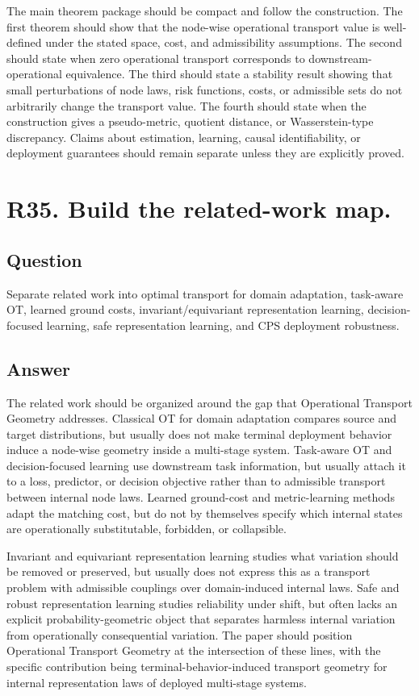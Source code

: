 \documentclass[11pt,a4paper]{article}
\begin{document}
The main theorem package should be compact and follow the construction. The first theorem should show that the node-wise operational transport value is well-defined under the stated space, cost, and admissibility assumptions. The second should state when zero operational transport corresponds to downstream-operational equivalence. The third should state a stability result showing that small perturbations of node laws, risk functions, costs, or admissible sets do not arbitrarily change the transport value. The fourth should state when the construction gives a pseudo-metric, quotient distance, or Wasserstein-type discrepancy. Claims about estimation, learning, causal identifiability, or deployment guarantees should remain separate unless they are explicitly proved.

\section*{R35. Build the related-work map.}

\subsection*{Question}

Separate related work into optimal transport for domain adaptation, task-aware OT, learned ground costs, invariant/equivariant representation learning, decision-focused learning, safe representation learning, and CPS deployment robustness.

\subsection*{Answer}

The related work should be organized around the gap that Operational Transport Geometry addresses. Classical OT for domain adaptation compares source and target distributions, but usually does not make terminal deployment behavior induce a node-wise geometry inside a multi-stage system. Task-aware OT and decision-focused learning use downstream task information, but usually attach it to a loss, predictor, or decision objective rather than to admissible transport between internal node laws. Learned ground-cost and metric-learning methods adapt the matching cost, but do not by themselves specify which internal states are operationally substitutable, forbidden, or collapsible.

Invariant and equivariant representation learning studies what variation should be removed or preserved, but usually does not express this as a transport problem with admissible couplings over domain-induced internal laws. Safe and robust representation learning studies reliability under shift, but often lacks an explicit probability-geometric object that separates harmless internal variation from operationally consequential variation. The paper should position Operational Transport Geometry at the intersection of these lines, with the specific contribution being terminal-behavior-induced transport geometry for internal representation laws of deployed multi-stage systems.
\end{document}
